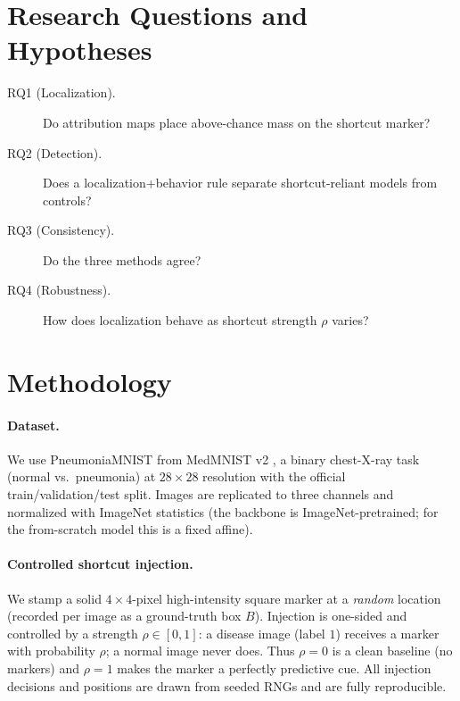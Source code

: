 \documentclass[11pt]{article}
\begin{document}
\section{Research Questions and Hypotheses}
\label{sec:rq}
\begin{description}
  \item[RQ1 (Localization).] Do attribution maps place above-chance mass on the shortcut marker?
  \item[RQ2 (Detection).] Does a localization+behavior rule separate shortcut-reliant models from controls?
  \item[RQ3 (Consistency).] Do the three methods agree?
  \item[RQ4 (Robustness).] How does localization behave as shortcut strength $\rho$ varies?
\end{description}

\section{Methodology}
\label{sec:method}

\paragraph{Dataset.} We use PneumoniaMNIST from MedMNIST v2 \citep{yang2023medmnist}, a binary
chest-X-ray task (normal vs.\ pneumonia) at $28\times28$ resolution with the official
train/validation/test split. Images are replicated to three channels and normalized with ImageNet
statistics (the backbone is ImageNet-pretrained; for the from-scratch model this is a fixed affine).

\paragraph{Controlled shortcut injection.} We stamp a solid $4\times4$-pixel high-intensity square
marker at a \emph{random} location (recorded per image as a ground-truth box $B$). Injection is
one-sided and controlled by a strength $\rho\in[0,1]$: a disease image (label $1$) receives a marker
with probability $\rho$; a normal image never does. Thus $\rho=0$ is a clean baseline (no markers)
and $\rho=1$ makes the marker a perfectly predictive cue. All injection decisions and positions are
drawn from seeded RNGs and are fully reproducible.
\end{document}
